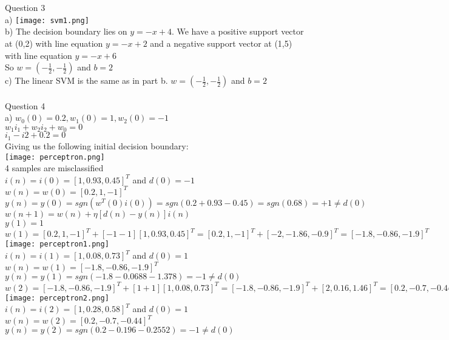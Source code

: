\documentclass{article}
\begin{document}
\\
\\
Question 3
\\
a) \texttt{[image: svm1.png]}
\\
b) The decision boundary lies on $y = -x+4$. We have a positive support vector at (0,2) with line equation $y=-x+2$ and a negative support vector at (1,5) with line equation $y = -x+6$
\\
So $w = (-\frac{1}{2}, -\frac{1}{2})$ and $b = 2 $
\\
c) The linear SVM is the same as in part b. $w = (-\frac{1}{2}, -\frac{1}{2})$ and $b = 2 $
\\
\\
Question 4
\\
a) $w_{0}(0) = 0.2, w_{1}(0)= 1, w_{2}(0) = -1$
\\ $w_{1}i_{1}+w_{2}i_{2} + w_{0} = 0$
\\ $i_{1}-i{2}+0.2=0$
\\ Giving us the following initial decision boundary:
\\
 \texttt{[image: perceptron.png]}
\\ 4 samples are misclassified
\\ $i(n) = i(0) = [1, 0.93, 0.45]^{T}$ and $ d(0) = -1$
\\ $w(n) = w(0)= [0.2, 1, -1]^{T}$
\\ $y(n) = y(0) = sgn(w^{T}(0)i(0)) = sgn(0.2+0.93-0.45) = sgn(0.68) = +1 \neq d(0)$
\\ $w(n+1) = w(n) + \eta [d(n) - y(n)]i(n)$
\\ $ y(1) = 1$
\\ $ w(1) = [0.2, 1, -1]^{T} +[-1-1][1, 0.93, 0.45]^{T}= [0.2, 1, -1]^{T} +[-2, -1.86, -0.9]^{T}= [-1.8,-0.86,-1.9]^{T}$
\\  \texttt{[image: perceptron1.png]}
\\ $i(n) = i(1) = [1, 0.08, 0.73]^{T}$ and $ d(0) = 1$
\\ $w(n) = w(1)=[-1.8,-0.86,-1.9]^{T}$
\\ $y(n) = y(1) = sgn(-1.8-0.0688-1.378) = -1 \neq d(0)$
\\ $ w(2) = [-1.8,-0.86,-1.9]^{T} +[1+1][1, 0.08, 0.73]^{T}= [-1.8,-0.86,-1.9]^{T} +[2, 0.16, 1.46]^{T}= [0.2,-0.7,-0.44]^{T}$
\\  \texttt{[image: perceptron2.png]}
\\ $i(n) = i(2) = [1, 0.28, 0.58]^{T}$ and $ d(0) = 1$
\\ $w(n) = w(2)=[0.2,-0.7,-0.44]^{T}$
\\ $y(n) = y(2) = sgn(0.2-0.196-0.2552) = -1 \neq d(0)$
\end{document}
